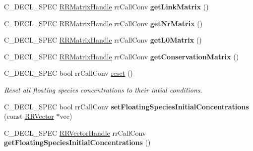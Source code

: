 \begin{DoxyCompactItemize}
\item 
\hypertarget{group__loadsave_gae8e8c6ede9f60e33dcdc190c061ce3f8}{
\-C\-\_\-\-D\-E\-C\-L\-\_\-\-S\-P\-E\-C \hyperlink{rr__c__types_8h_a87174eefa58ae98dec58c9253ae6c5da}{\-R\-R\-Matrix\-Handle} \*
rr\-Call\-Conv {\bfseries get\-Link\-Matrix} ()}
\label{group__loadsave_gae8e8c6ede9f60e33dcdc190c061ce3f8}

\item 
\hypertarget{group__loadsave_ga57b4c651ecffb52d28886ce9e3b6e6ed}{
\-C\-\_\-\-D\-E\-C\-L\-\_\-\-S\-P\-E\-C \hyperlink{rr__c__types_8h_a87174eefa58ae98dec58c9253ae6c5da}{\-R\-R\-Matrix\-Handle} \*
rr\-Call\-Conv {\bfseries get\-Nr\-Matrix} ()}
\label{group__loadsave_ga57b4c651ecffb52d28886ce9e3b6e6ed}

\item 
\hypertarget{group__loadsave_ga587ae0ec7e6e7f8b2576bacf700eedcd}{
\-C\-\_\-\-D\-E\-C\-L\-\_\-\-S\-P\-E\-C \hyperlink{rr__c__types_8h_a87174eefa58ae98dec58c9253ae6c5da}{\-R\-R\-Matrix\-Handle} \*
rr\-Call\-Conv {\bfseries get\-L0\-Matrix} ()}
\label{group__loadsave_ga587ae0ec7e6e7f8b2576bacf700eedcd}

\item 
\hypertarget{group__loadsave_gafd1bcae76af0d5d6ccf7af7bd098de23}{
\-C\-\_\-\-D\-E\-C\-L\-\_\-\-S\-P\-E\-C \hyperlink{rr__c__types_8h_a87174eefa58ae98dec58c9253ae6c5da}{\-R\-R\-Matrix\-Handle} \*
rr\-Call\-Conv {\bfseries get\-Conservation\-Matrix} ()}
\label{group__loadsave_gafd1bcae76af0d5d6ccf7af7bd098de23}

\item 
\-C\-\_\-\-D\-E\-C\-L\-\_\-\-S\-P\-E\-C bool rr\-Call\-Conv \hyperlink{group__loadsave_ga07dfaf16ab38015aab6b400665ace2b2}{reset} ()
\begin{DoxyCompactList}\small\item\em \-Reset all floating species concentrations to their intial conditions. \end{DoxyCompactList}\item 
\hypertarget{group__loadsave_ga338d8b7e0648b293a134e69bd7862dc6}{
\-C\-\_\-\-D\-E\-C\-L\-\_\-\-S\-P\-E\-C bool rr\-Call\-Conv {\bfseries set\-Floating\-Species\-Initial\-Concentrations} (const \hyperlink{struct_r_r_vector}{\-R\-R\-Vector} $\ast$vec)}
\label{group__loadsave_ga338d8b7e0648b293a134e69bd7862dc6}

\item 
\hypertarget{group__loadsave_ga6458f13569fc543075b559978f4f83ac}{
\-C\-\_\-\-D\-E\-C\-L\-\_\-\-S\-P\-E\-C \hyperlink{rr__c__types_8h_aea46a16752b0ae2cd95c009030ee630e}{\-R\-R\-Vector\-Handle} \*
rr\-Call\-Conv {\bfseries get\-Floating\-Species\-Initial\-Concentrations} ()}
\label{group__loadsave_ga6458f13569fc543075b559978f4f83ac}


\end{DoxyCompactItemize}
